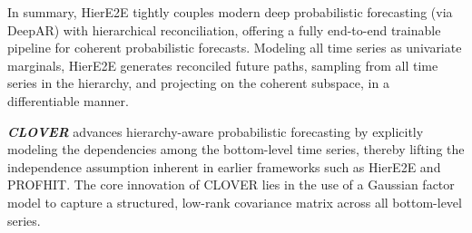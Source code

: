 \documentclass[letterpaper]{article}
\begin{document}
In summary, HierE2E tightly couples modern deep probabilistic forecasting (via DeepAR) with hierarchical reconciliation, offering a fully end-to-end trainable pipeline for coherent probabilistic forecasts. 
Modeling all time series as univariate marginals, HierE2E generates reconciled future paths, sampling from all time series in the hierarchy, and projecting on the coherent subspace, in a differentiable manner. 


\textit{\textbf{CLOVER}} advances hierarchy-aware probabilistic forecasting by explicitly modeling the dependencies among the bottom-level time series, thereby lifting the independence assumption inherent in earlier frameworks such as HierE2E and PROFHIT. 
The core innovation of CLOVER lies in the use of a Gaussian factor model to capture a structured, low-rank covariance matrix across all bottom-level series.
\end{document}
